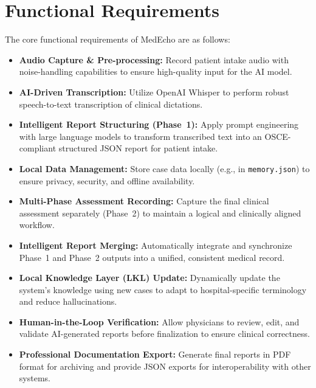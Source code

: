 \section{Functional Requirements}\label{sec:analysis:functional}

The core functional requirements of MedEcho are as follows:

\begin{itemize}
    \item \textbf{Audio Capture \& Pre-processing:} Record patient intake audio with noise-handling capabilities to ensure high-quality input for the AI model.

    \item \textbf{AI-Driven Transcription:} Utilize OpenAI Whisper to perform robust speech-to-text transcription of clinical dictations.

    \item \textbf{Intelligent Report Structuring (Phase~1):} Apply prompt engineering with large language models to transform transcribed text into an OSCE-compliant structured JSON report for patient intake.

    \item \textbf{Local Data Management:} Store case data locally (e.g., in \texttt{memory.json}) to ensure privacy, security, and offline availability.

    \item \textbf{Multi-Phase Assessment Recording:} Capture the final clinical assessment separately (Phase~2) to maintain a logical and clinically aligned workflow.

    \item \textbf{Intelligent Report Merging:} Automatically integrate and synchronize Phase~1 and Phase~2 outputs into a unified, consistent medical record.

    \item \textbf{Local Knowledge Layer (LKL) Update:} Dynamically update the system’s knowledge using new cases to adapt to hospital-specific terminology and reduce hallucinations.

    \item \textbf{Human-in-the-Loop Verification:} Allow physicians to review, edit, and validate AI-generated reports before finalization to ensure clinical correctness.

    \item \textbf{Professional Documentation Export:} Generate final reports in PDF format for archiving and provide JSON exports for interoperability with other systems.
\end{itemize}

